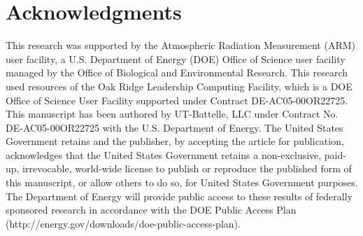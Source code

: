 \section*{Acknowledgments}
This research was supported by the Atmospheric Radiation Measurement (ARM) user 
facility, a U.S. Department of Energy (DOE) Office of Science user facility 
managed by the Office of Biological and Environmental Research.
This research used resources of the Oak Ridge
Leadership Computing Facility, which is a DOE Office of Science User Facility supported under Contract
DE-AC05-00OR22725.
This manuscript has been authored by UT-Battelle, LLC under Contract No. DE-AC05-00OR22725 with
the U.S. Department of Energy. The United States Government retains and 
the publisher, by accepting the article for publication, acknowledges 
that the United States Government retains a non-exclusive, paid- up, 
irrevocable, world-wide license to publish or reproduce the published 
form of this manuscript, or allow others to do so, for United States 
Government purposes. The Department of Energy will provide public access 
to these results of federally sponsored research in accordance with the 
DOE Public Access Plan (http://energy.gov/downloads/doe-public-access-plan).
